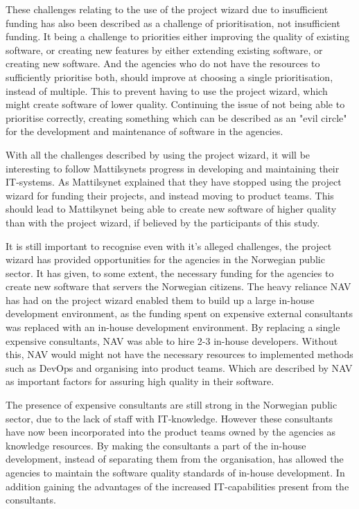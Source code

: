 These challenges relating to the use of the project wizard due to insufficient funding has also been described as a challenge of prioritisation, not insufficient funding. It being a challenge to priorities either improving the quality of existing software, or creating new features by either extending existing software, or creating new software. And the agencies who do not have the resources to sufficiently prioritise both, should improve at choosing a single prioritisation, instead of multiple. This to prevent having to use the project wizard, which might create software of lower quality. Continuing the issue of not being able to prioritise correctly, creating something which can be described as an "evil circle" for the development and maintenance of software in the agencies.

With all the challenges described by using the project wizard, it will be interesting to follow Mattilsynets progress in developing and maintaining their IT-systems. As Mattilsynet explained that they have stopped using the project wizard for funding their projects, and instead moving to product teams. This should lead to Mattilsynet being able to create new software of higher quality than with the project wizard, if believed by the participants of this study.

It is still important to recognise even with it's alleged challenges, the project wizard has provided opportunities for the agencies in the Norwegian public sector. It has given, to some extent, the necessary funding for the agencies to create new software that servers the Norwegian citizens. The heavy reliance NAV has had on the project wizard enabled them to build up a large in-house development environment, as the funding spent on expensive external consultants was replaced with an in-house development environment. By replacing a single expensive consultants, NAV was able to hire 2-3 in-house developers. Without this, NAV would might not have the necessary resources to implemented methods such as DevOps and organising into product teams. Which are described by NAV as important factors for assuring high quality in their software.

The presence of expensive consultants are still strong in the Norwegian public sector, due to the lack of staff with IT-knowledge. However these consultants have now been incorporated into the product teams owned by the agencies as knowledge resources. By making the consultants a part of the in-house development, instead of separating them from the organisation, has allowed the agencies to maintain the software quality standards of in-house development. In addition gaining the advantages of the increased IT-capabilities present from the consultants.

